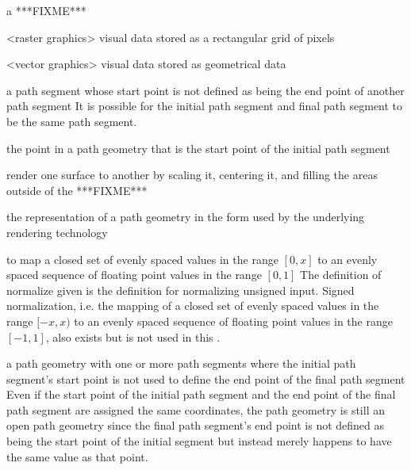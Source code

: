 a ***FIXME***

<raster graphics> visual data stored as a rectangular grid of pixels

<vector graphics> visual data stored as geometrical data

a path segment whose start point is not defined as being the end point of another path segment
\enternote
It is possible for the initial path segment and final path segment to be the same path segment.
\exitnote

the point in a path geometry that is the start point of the initial path segment

render one surface to another by scaling it, centering it, and filling the 
areas outside of the  ***FIXME***

the representation of a path geometry in the form used by the underlying rendering technology

to map a closed set of evenly spaced values in the range $[0, x]$ to an evenly spaced sequence of floating point values in the range $[0, 1]$
\enternote
The definition of normalize given is the definition for normalizing unsigned input. Signed normalization, i.e. the mapping of a closed set of evenly spaced values in the range $[-x, x)$ to an evenly spaced sequence of floating point values in the range $[-1, 1]$, also exists but is not used in this \documenttypename.
\exitnote

a path geometry with one or more path segments where the initial path segment's start point is not used to define the end point of the final path segment
\enternote
Even if the start point of the initial path segment and the end point of the final path segment are assigned the same coordinates, the path geometry is still an open path geometry since the final path segment's end point is not defined as being the start point of the initial segment but instead merely happens to have the same value as that point.
\exitnote

